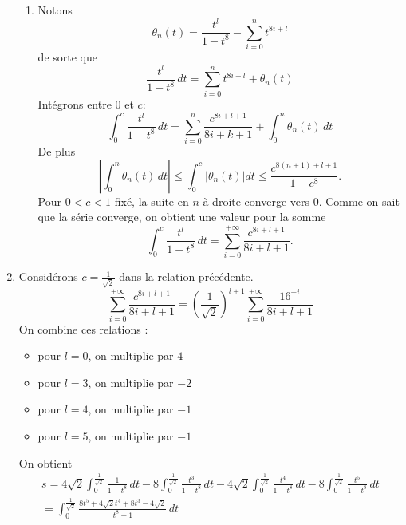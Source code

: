 \begin{enumerate}
\begin{enumerate}
 \item Notons 
\begin{displaymath}
 \theta_n(t) = \frac{t^l}{1-t^8} - \sum_{i=0}^n t^{8i+l}
\end{displaymath}
de sorte que 
\begin{displaymath}
 \frac{t^l}{1-t^8}\,dt = \sum_{i=0}^n t^{8i+l} +\theta_n(t)
\end{displaymath}
Intégrons entre $0$ et $c$:
\begin{displaymath}
\int_0^c \frac{t^l}{1-t^8}\,dt = \sum_{i=0}^n\frac{c^{8i+l+1}}{8i+k+1} + \int_0^n\theta_n(t)\,dt 
\end{displaymath}
De plus 
\begin{displaymath}
 \left| \int_0^n\theta_n(t)\,dt \right| \leq \int_0^c |\theta_n(t)|dt 
\leq \frac{c^{8(n+1)+l+1}}{1-c^8}.
\end{displaymath}
Pour $0<c<1$ fixé, la suite en $n$ à droite converge vers $0$. Comme on sait que la série converge, on obtient une valeur pour la somme
\begin{displaymath}
\int_0^c \frac{t^l}{1-t^8}\,dt = \sum_{i=0}^{+\infty}\frac{c^{8i+l+1}}{8i+l+1}.
\end{displaymath}
\end{enumerate}

 \item Considérons $c=\frac{1}{\sqrt{2}}$ dans la relation précédente.
\begin{displaymath}
 \sum_{i=0}^{+\infty}\frac{c^{8i+l+1}}{8i+l+1} = \left(\frac{1}{\sqrt{2}} \right)^{l+1} \sum_{i=0}^{+\infty}\frac{16^{-i}}{8i+l+1}
\end{displaymath}
On combine ces relations :
\begin{itemize}
 \item pour $l=0$, on multiplie par $4$
 \item pour $l=3$, on multiplie par $-2$
 \item pour $l=4$, on multiplie par $-1$
 \item pour $l=5$, on multiplie par $-1$
\end{itemize}
On obtient
\begin{multline*}
s = 
4\sqrt{2}\int_0^{\frac{1}{\sqrt{2}}} \frac{1}{1-t^8}\,dt 
-8 \int_0^{\frac{1}{\sqrt{2}}} \frac{t^3}{1-t^8}\,dt
-4\sqrt{2}\int_0^{\frac{1}{\sqrt{2}}} \frac{t^4}{1-t^8}\,dt
-8\int_0^{\frac{1}{\sqrt{2}}} \frac{t^5}{1-t^8}\,dt \\
= \int_0^{\frac{1}{\sqrt{2}}} \frac{8t^5 + 4\sqrt{2}t^4 + 8t^3 -4\sqrt{2}}{t^8 -1}\,dt
\end{multline*}
 

\end{enumerate}
